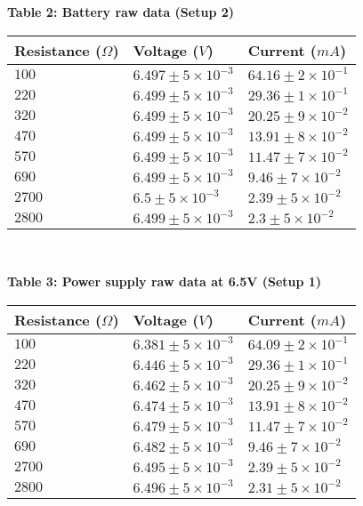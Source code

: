 \begin{center}
    {\textbf{Table 2: Battery raw data (Setup 2)} }
\end{center}
\vspace{10pt}
\begin{tabular}{| p{} | p{} | p{} |}
    \hline
    Resistance ($\Omega$) & Voltage ($V$) & Current ($mA$)\\
    \hline 
    $100$ & $6.497 \pm 5\times10^{-3}$ & $64.16 \pm 2\times10^{-1}$\\
    $220$ & $6.499 \pm 5\times10^{-3}$ & $29.36 \pm 1\times10^{-1}$\\
    $320$ & $6.499 \pm 5\times10^{-3}$ & $20.25 \pm 9\times10^{-2}$\\
    $470$ & $6.499 \pm 5\times10^{-3}$ & $13.91 \pm 8\times10^{-2}$\\
    $570$ & $6.499 \pm 5\times10^{-3}$ & $11.47 \pm 7\times10^{-2}$\\
    $690$ & $6.499 \pm 5\times10^{-3}$ & $9.46 \pm 7\times10^{-2}$\\
    $2700$ & $6.5 \pm 5\times10^{-3}$ & $2.39 \pm 5\times10^{-2}$\\
    $2800$ & $6.499 \pm 5\times10^{-3}$ & $2.3 \pm 5\times10^{-2}$\\
    \hline 
 \end{tabular}\\

\begin{center}
    {\textbf{Table 3: Power supply raw data at 6.5V (Setup 1)} }
\end{center}
\vspace{10pt}
\newpage

\begin{tabular}{| p{} | p{} | p{} |}
    \hline
    Resistance ($\Omega$) & Voltage ($V$) & Current ($mA$)\\
    \hline 
    $100$ & $6.381 \pm 5\times10^{-3}$ & $64.09 \pm 2\times10^{-1}$\\
    $220$ & $6.446 \pm 5\times10^{-3}$ & $29.36 \pm 1\times10^{-1}$\\
    $320$ & $6.462 \pm 5\times10^{-3}$ & $20.25 \pm 9\times10^{-2}$\\
    $470$ & $6.474 \pm 5\times10^{-3}$ & $13.91 \pm 8\times10^{-2}$\\
    $570$ & $6.479 \pm 5\times10^{-3}$ & $11.47 \pm 7\times10^{-2}$\\
    $690$ & $6.482 \pm 5\times10^{-3}$ & $9.46 \pm 7\times10^{-2}$\\
    $2700$ & $6.495 \pm 5\times10^{-3}$ & $2.39 \pm 5\times10^{-2}$\\
    $2800$ & $6.496 \pm 5\times10^{-3}$ & $2.31 \pm 5\times10^{-2}$\\
    \hline 
 \end{tabular}\\

